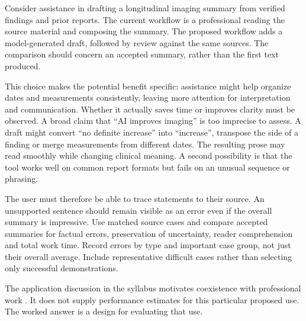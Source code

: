 \biomedicalanswer
{}
Consider assistance in drafting a longitudinal imaging summary from verified findings and prior reports. The current workflow is a professional reading the source material and composing the summary. The proposed workflow adds a model-generated draft, followed by review against the same sources. The comparison should concern an accepted summary, rather than the first text produced.

This choice makes the potential benefit specific: assistance might help organize dates and measurements consistently, leaving more attention for interpretation and communication. Whether it actually saves time or improves clarity must be observed. A broad claim that ``AI improves imaging'' is too imprecise to assess.
A draft might convert ``no definite increase'' into ``increase'', transpose the side of a finding or merge measurements from different dates. The resulting prose may read smoothly while changing clinical meaning. A second possibility is that the tool works well on common report formats but fails on an unusual sequence or phrasing.

The user must therefore be able to trace statements to their source. An unsupported sentence should remain visible as an error even if the overall summary is impressive.
Use matched source cases and compare accepted summaries for factual errors, preservation of uncertainty, reader comprehension and total work time. Record errors by type and important case group, not just their overall average. Include representative difficult cases rather than selecting only successful demonstrations.

The application discussion in the syllabus motivates coexistence with professional work \citep{mollick2026coexistence}. It does not supply performance estimates for this particular proposed use. The worked answer is a design for evaluating that use.

